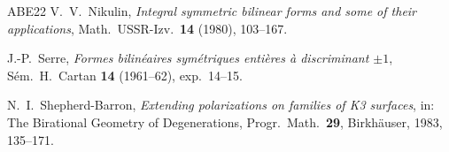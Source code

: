 \documentclass[11pt]{article}
\theoremstyle{definition}
\theoremstyle{remark}
\begin{document}
\begin{thebibliography}{ABE22}
V.~V.~Nikulin,
\emph{Integral symmetric bilinear forms and some of their
applications}, Math.\ USSR-Izv.\ \textbf{14} (1980), 103--167.

J.-P.~Serre,
\emph{Formes bilin\'eaires sym\'etriques enti\`eres \`a discriminant
\(\pm1\)}, S\'em.\ H.~Cartan \textbf{14} (1961--62), exp.\ 14--15.

N.~I.~Shepherd-Barron,
\emph{Extending polarizations on families of K3 surfaces},
in: The Birational Geometry of Degenerations, Progr.\ Math.\
\textbf{29}, Birkh\"auser, 1983, 135--171.

\end{thebibliography}
\end{document}
